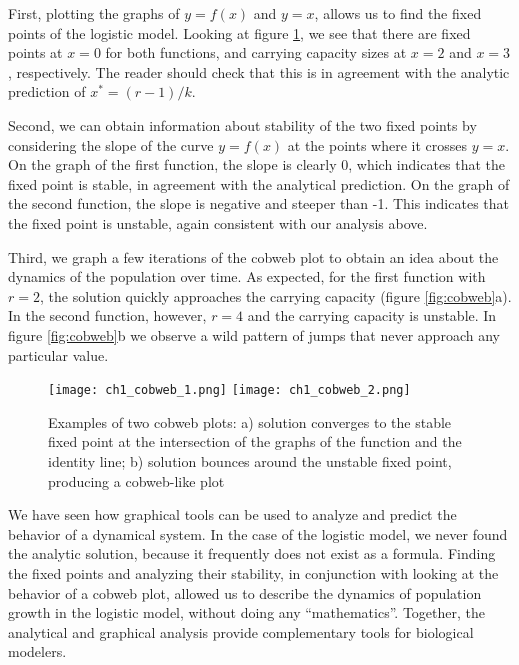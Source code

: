 \documentclass[11pt]{book}
\begin{document}
First, plotting the graphs of $y=f(x)$ and $y=x$, allows us to find the fixed points of the logistic model. Looking at figure \ref{fig:logistic_cobweb}, we see that there are fixed points at $x = 0$ for both functions, and carrying capacity sizes at $x=2$ and $x=3$, respectively. The reader should check that this is in agreement with the analytic prediction of $x^* = (r-1)/k$.

Second, we can obtain information about stability of the two fixed points by considering the slope of the curve $y=f(x)$ at the points where it crosses $y=x$. On the graph of the first function, the slope is clearly 0, which indicates that the fixed point is stable, in agreement with the analytical prediction. On the graph of the second function, the slope is negative and steeper than -1. This indicates that the fixed point is unstable, again consistent with our analysis above.

Third, we graph a few iterations of the cobweb plot to obtain an idea about the dynamics of the population over time. As expected, for the first function with $r=2$, the solution quickly approaches the carrying capacity (figure \ref{fig:cobweb}a). In the second function, however, $r = 4$ and the carrying capacity is unstable. In figure \ref{fig:cobweb}b we observe a wild pattern of jumps that never approach any particular value.

\begin{figure}[htbp] %
   \centering
   \texttt{[image: ch1\_cobweb\_1.png]}
   \texttt{[image: ch1\_cobweb\_2.png]}
   \caption{Examples of two cobweb plots: a) solution converges to the stable fixed point at the intersection of the graphs of the function and the identity line; b) solution bounces around the unstable fixed point, producing a cobweb-like plot}
   \label{fig:logistic_cobweb}
\end{figure}

We have seen how graphical tools can be used to analyze and predict the behavior of a dynamical system. In the case of the logistic model, we never found the analytic solution, because it frequently does not exist as a formula. Finding the fixed points and analyzing their stability, in conjunction with looking at the behavior of a cobweb plot, allowed us to describe the dynamics of population growth in the logistic model, without doing any ``mathematics''. Together, the analytical and graphical analysis provide complementary  tools for biological modelers.
\end{document}
